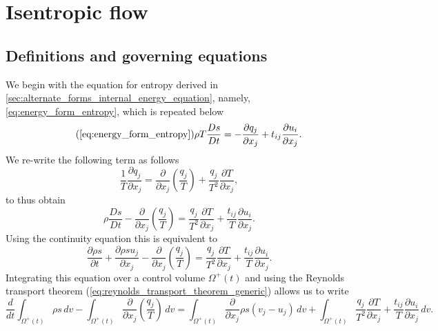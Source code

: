 \documentclass[oneside,a4paper,11pt]{report}
\begin{document}
\chapter{Isentropic flow}

\section{Definitions and governing equations}
We begin with the equation for entropy derived in \cref{sec:alternate_forms_internal_energy_equation}, namely, \cref{eq:energy_form_entropy}, which is repeated below
\begin{equation}
\tag{\ref{eq:energy_form_entropy}}
    \rho T \frac{Ds}{Dt} = -\frac{\partial q_j}{\partial x_j} + t_{ij} \frac{\partial u_i}{\partial x_j}.
\end{equation}
We re-write the following term as follows
\begin{equation}
    \frac{1}{T} \frac{\partial q_j}{\partial x_j} = \frac{\partial}{\partial x_j} \left ( \frac{q_j}{T} \right ) + \frac{q_j}{T^2}\frac{\partial T}{\partial x_j},
\end{equation}
to thus obtain
\begin{equation}
    \rho \frac{Ds}{Dt} - \frac{\partial}{\partial x_j} \left ( \frac{q_j}{T} \right ) = \frac{q_j}{T^2}\frac{\partial T}{\partial x_j} + \frac{t_{ij}}{T} \frac{\partial u_i}{\partial x_j}.
\end{equation}
Using the continuity equation this is equivalent to
\begin{equation}
    \frac{\partial \rho s}{\partial t} + \frac{\partial \rho s u_j}{\partial x_j} - \frac{\partial}{\partial x_j} \left ( \frac{q_j}{T} \right ) = \frac{q_j}{T^2}\frac{\partial T}{\partial x_j} + \frac{t_{ij}}{T} \frac{\partial u_i}{\partial x_j}.
\end{equation}
Integrating this equation over a control volume $\Omega^+(t)$ and using the Reynolds transport theorem (\cref{eq:reynolds_transport_theorem_generic}) allows us to write
\begin{equation}
    \frac{d}{dt} \int_{\Omega^+(t)} \rho s \, dv - \int_{\Omega^+(t)} \frac{\partial}{\partial x_j} \left ( \frac{q_j}{T} \right ) \,dv = \int_{\Omega^+(t)} \frac{\partial}{\partial x_j} \rho s \left (v_j - u_j \right ) \, dv + \int_{\Omega^+(t)} \frac{q_j}{T^2}\frac{\partial T}{\partial x_j} + \frac{t_{ij}}{T} \frac{\partial u_i}{\partial x_j} \, dv.
\end{equation}
\end{document}
